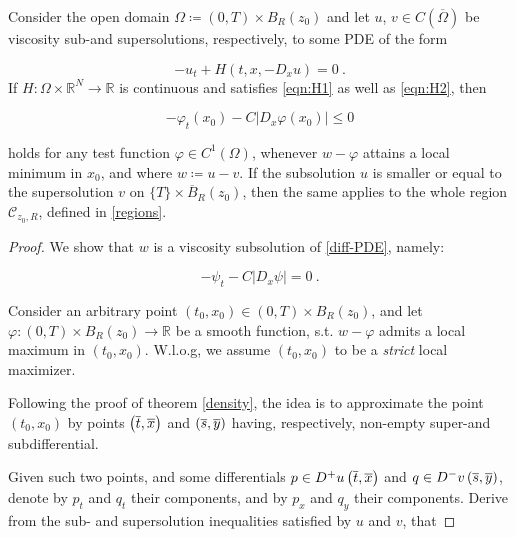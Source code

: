\begin{theorem}
	\label{viscosity_loc}
	Consider the open domain $ \Omega \coloneqq \left( 0, T \right) \times B_R(z_0) $ and let $ u $, $ v \in C(\overline{\Omega}) $ be viscosity sub-and supersolutions, respectively, to some PDE of the form
	
	\begin{equation*}
	-u_t + H(t, x, -D_x u) = 0 \ .
	\end{equation*}
	If $ H : \Omega \times \mathbb{R}^{N} \to \mathbb{R} $ is continuous and satisfies \eqref{eqn:H1} as well as \eqref{eqn:H2}, then
	
	\begin{equation*}
	-\varphi_t(x_0) - C \lvert D_x \varphi(x_0) \rvert \leq 0 
	\end{equation*}
	
	holds for any test function $ \varphi \in C^{1}(\Omega) $, whenever $ w - \varphi $ attains a local minimum in $ x_0 $, and where $ w \coloneqq u - v $. If the subsolution $ u $ is smaller or equal to the supersolution $ v $ on $ \{ T \} \times \overline{B}_R (z_0) $, then the same applies to the whole region $ \mathcal{C}_{z_0, R} $, defined in \ref{regions}.
		  	\begin{proof}
		  		We show that $ w $ is a viscosity subsolution of \eqref{diff-PDE}, namely:
		  		
		  		\begin{equation*}
		  			-\psi_t - C \lvert D_x \psi \rvert = 0 \ .
		  		\end{equation*}
		  		
		  		Consider an arbitrary point $ (t_0, x_0) \in \left( 0, T \right) \times B_R(z_0) $, and let $ \varphi : \left( 0, T \right) \times B_R(z_0) \to \mathbb{R} $ be a smooth function, s.t. $ w - \varphi $ admits a local maximum in $ (t_0, x_0) $. W.l.o.g, we assume $ (t_0, x_0) $ to be a \emph{strict} local maximizer.
		  		
		  		Following the proof of theorem \ref{density}, the idea is to approximate the point $ (t_0, x_0) $ by points $ \left(\overline{t}, \overline{x}\right) $ and $ \left(\overline{s}, \overline{y}\right) $ having, respectively, non-empty super-and subdifferential.
		  		
		  		Given such two points, and some differentials $ p \in D^{+} u \left(\overline{t}, \overline{x}\right) $ and $ q \in D^{-} v \left(\overline{s}, \overline{y}\right) $, denote by $ p_t $ and $ q_t $ their  components, and by $ p_x $ and $ q_y $ their  components. Derive from the sub- and supersolution inequalities satisfied by $ u $ and $ v $, that
		  		

\end{proof}
\end{theorem}
